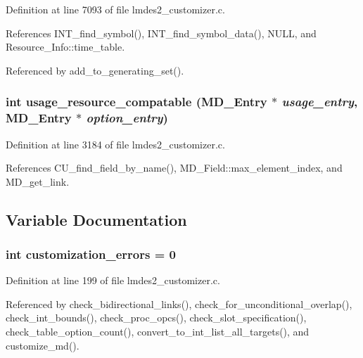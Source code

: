 Definition at line 7093 of file lmdes2\_\-customizer.c.

References INT\_\-find\_\-symbol(), INT\_\-find\_\-symbol\_\-data(), NULL, and Resource\_\-Info::time\_\-table.

Referenced by add\_\-to\_\-generating\_\-set().
\subsubsection{\setlength{\rightskip}{0pt plus 5cm}int usage\_\-resource\_\-compatable (\bf{MD\_\-Entry} $\ast$ {\em usage\_\-entry}, \bf{MD\_\-Entry} $\ast$ {\em option\_\-entry})}\label{lmdes2__customizer_8c_bc7d12e76acc86904bdebd5296230f21}




Definition at line 3184 of file lmdes2\_\-customizer.c.

References CU\_\-find\_\-field\_\-by\_\-name(), MD\_\-Field::max\_\-element\_\-index, and MD\_\-get\_\-link.

\subsection{Variable Documentation}
\subsubsection{\setlength{\rightskip}{0pt plus 5cm}int \bf{customization\_\-errors} = 0}\label{lmdes2__customizer_8c_d3c82b27bc8b51337e625c1969a5e7bc}




Definition at line 199 of file lmdes2\_\-customizer.c.

Referenced by check\_\-bidirectional\_\-links(), check\_\-for\_\-unconditional\_\-overlap(), check\_\-int\_\-bounds(), check\_\-proc\_\-opcs(), check\_\-slot\_\-specification(), check\_\-table\_\-option\_\-count(), convert\_\-to\_\-int\_\-list\_\-all\_\-targets(), and customize\_\-md().
